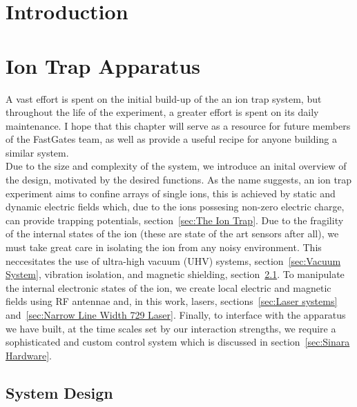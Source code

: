 \documentclass[12pt]{report}
\begin{document}

\chapter{Introduction}



\chapter{Ion Trap Apparatus}

A vast effort is spent on the initial build-up of the an ion trap system, but
throughout the life of the experiment, a greater effort is spent on its daily
maintenance.  I hope that this chapter will serve as a resource for future
members of the FastGates team, as well as provide a useful recipe for anyone
building a similar system. \\

Due to the size and complexity of the system, we introduce an inital overview of
the design, motivated by the desired functions.  As the name suggests, an ion
trap experiment aims to confine arrays of single ions, this is achieved by
static and dynamic electric fields which, due to the ions possesing non-zero
electric charge, can provide trapping potentials, section~\ref{sec:The Ion
Trap}. Due to the fragility of the internal states of the ion (these are state
of the art sensors after all), we must take great care in isolating the ion from
any noisy environment. This neccesitates the use of ultra-high vacuum (UHV)
systems, section~\ref{sec:Vacuum System}, vibration isolation, and magnetic
shielding, section~\ref{sec:System Design}. To manipulate the internal electronic states of the ion, we create
local electric and magnetic fields using RF antennae and, in this work, lasers,
sections~\ref{sec:Laser systems} and~\ref{sec:Narrow Line Width 729 Laser}.
Finally, to interface with the apparatus we have built, at the time scales set by our interaction strengths, we require a sophisticated and custom control system which is discussed in section~\ref{sec:Sinara Hardware}.

\section{System Design}
\label{sec:System Design}
\end{document}
